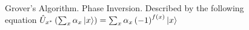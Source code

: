 \begin{figure}
\centering



\caption{Grover's Algorithm. Phase Inversion. Described by the following
  equation  $\hat{U}_{x^{\ast}}\left(\sum_x \alpha_x
  \ket{x}\right) =  
\sum_x \alpha_x \left(-1\right)^{f\left(x\right)}\ket{x}$}
\label{figQuantCompGroverInv}
\end{figure}